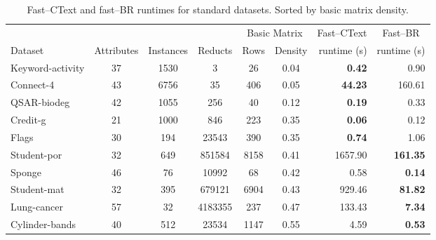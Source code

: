 \documentclass[citeauthoryear]{llncs}
\begin{document}
	\begin{table}[htb]
		\centering \footnotesize
		\caption{Fast--CText and fast--BR runtimes for standard datasets. Sorted by basic matrix density.}
		\label{tab:density}
		\begin{tabular}{lcccccrr}
			\hline
			&&&& \multicolumn{2}{c}{Basic Matrix} &  \multicolumn{1}{c}{Fast--CText} & \multicolumn{1}{c}{Fast--BR} \\
			\cline{5-6}
			Dataset   		 & Attributes & Instances & Reducts  & Rows  & Density & runtime (s) & runtime (s) \\
			\hline
			Keyword-activity & 37         & 1530      & 3        & 26    & 0.04    & \textbf{0.42}    & 0.90            \\
			Connect-4        & 43         & 6756      & 35       & 406   & 0.05    & \textbf{44.23}   & 160.61          \\
			QSAR-biodeg      & 42         & 1055      & 256      & 40    & 0.12    & \textbf{0.19}    & 0.33            \\
			Credit-g         & 21         & 1000      & 846      & 223   & 0.35    & \textbf{0.06}    & 0.12            \\
			Flags            & 30         & 194       & 23543    & 390   & 0.35    & \textbf{0.74}    & 1.06            \\
			Student-por      & 32         & 649       & 851584   & 8158  & 0.41    & 1657.90          & \textbf{161.35} \\
			Sponge           & 46         & 76        & 10992    & 68    & 0.42    & 0.58             & \textbf{0.14}   \\
			Student-mat      & 32         & 395       & 679121   & 6904  & 0.43    & 929.46           & \textbf{81.82}  \\
			Lung-cancer      & 57         & 32        & 4183355  & 237   & 0.47    & 133.43           & \textbf{7.34}   \\
			Cylinder-bands   & 40         & 512       & 23534    & 1147  & 0.55    & 4.59             & \textbf{0.53}   \\
			\hline
		\end{tabular}
	\end{table}
%
%
\end{document}
